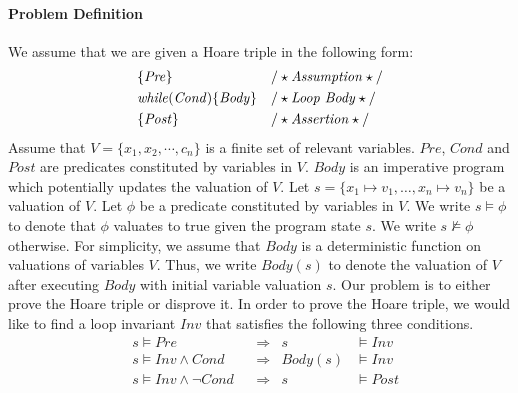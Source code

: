 \paragraph{Problem Definition} We assume that we are given a Hoare triple in the following form:
\begin{align*}
&\{\mathit{Pre}\} & & /\star\text{\emph{Assumption}}\star/ \\
&\mathit{while} (\mathit{Cond}) \{ \mathit{Body} \} && /\star\text{\emph{Loop Body}}\star/\\
&\{\mathit{Post}\} & & /\star\text{\emph{Assertion}}\star/
\end{align*}
Assume that $V = \{x_1, x_2, \cdots, c_n\}$ is a finite set of relevant variables. $\mathit{Pre}$, $\mathit{Cond}$ and $\mathit{Post}$ are predicates constituted by variables in $V$. $\mathit{Body}$ is an imperative program which potentially updates the valuation of $V$.
Let $s = \{ x_1 \mapsto v_1, \ldots, x_n \mapsto v_n \}$ be a valuation of $V$. Let $\phi$ be a predicate constituted by variables in $V$. We write $s \models \phi$ to denote that $\phi$ valuates to true given the program state $s$. We write $s \not \models \phi$ otherwise. For simplicity, we assume that $\mathit{Body}$ is a deterministic function on valuations of variables $V$. Thus, we write $\mathit{Body}(s)$ to denote the valuation of $V$ after executing $\mathit{Body}$ with initial variable valuation $s$.
Our problem is to either prove the Hoare triple or disprove it. In order to prove the Hoare triple, we would like to find a loop invariant $\mathit{Inv}$ that satisfies the following three conditions.
\begin{align}
    &s \models \mathit{Pre}
        &&\Longrightarrow & s &\models \mathit{Inv} \label{inv:pre} \\
    &s \models \mathit{Inv} \wedge \mathit{Cond}
        &&\Longrightarrow & \mathit{Body}(s) &\models \mathit{Inv} \label{inv:loop} \\
    &s \models \mathit{Inv} \wedge \neg\mathit{Cond}
        &&\Longrightarrow & s &\models \mathit{Post} \label{inv:post}
\end{align}
